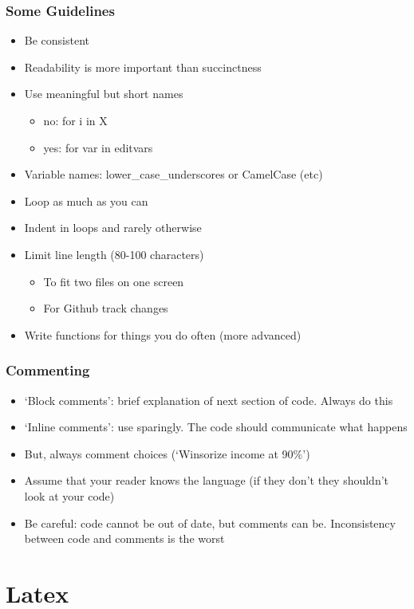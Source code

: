 \documentclass{beamer}
\begin{document}
\begin{frame}[t]\frametitle{Some Guidelines}
	\begin{itemize}
		\item Be consistent
		\item Readability is more important than succinctness 
		\item Use meaningful but short names
		\begin{itemize}
			\item no:  for i in X 
			\item yes: for var in editvars 
		\end{itemize}
		\item Variable names: lower\_case\_underscores or CamelCase (etc)
		\item Loop as much as you can
		\item Indent in loops and rarely otherwise
		\item Limit line length (80-100 characters)
		\begin{itemize}
			\item To fit two files on one screen
			\item For Github track changes
		\end{itemize}
		\item Write functions for things you do often (more advanced)
	\end{itemize}
\end{frame}

\begin{frame}[t]\frametitle{Commenting}
	\begin{itemize}
		\item `Block comments': brief explanation of next section of code. Always do this
		\item `Inline comments': use sparingly. The code should communicate what happens
		\item But, always comment choices (`Winsorize income at 90\%')
		\item Assume that your reader knows the language (if they don't they shouldn't look at your code)
		\item Be careful: code cannot be out of date, but comments can be. Inconsistency between code and comments is the worst
	\end{itemize}
\end{frame}

\section{Latex}
\end{document}
